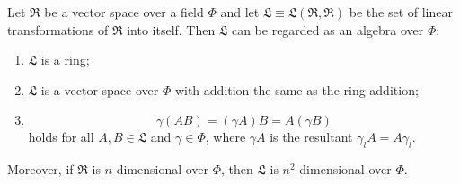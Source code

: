 Let $\mathfrak{R}$ be a vector space over a field $\Phi$ and let $\mathfrak{L} \equiv \mathfrak{L}(\mathfrak{R}, \mathfrak{R})$ be the set of linear transformations of $\mathfrak{R}$ into itself. Then $\mathfrak{L}$ can be regarded as an algebra over $\Phi$:
\begin{enumerate}
\item $\mathfrak{L}$ is a ring;
\item $\mathfrak{L}$ is a vector space over $\Phi$ with addition the same as the ring addition;
\item $$\gamma(AB) = (\gamma A)B = A(\gamma B)$$ holds for all $A, B \in \mathfrak{L}$ and $\gamma \in \Phi$, where $\gamma A$ is the resultant $\gamma_l A = A\gamma_l$.
\end{enumerate}
Moreover, if $\mathfrak{R}$ is $n$-dimensional over $\Phi$, then $\mathfrak{L}$ is $n^2$-dimensional over $\Phi$.
